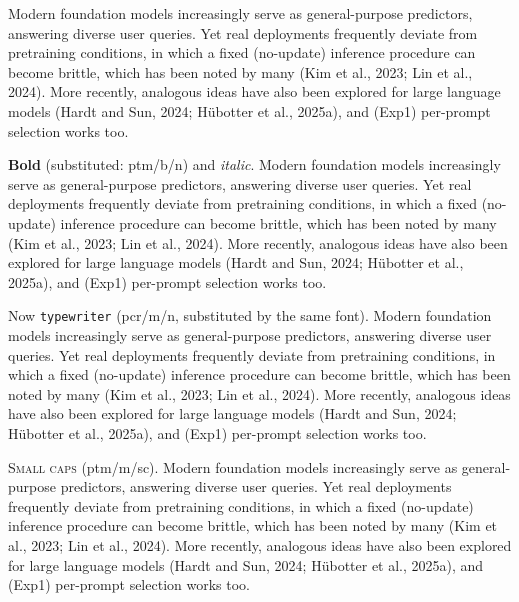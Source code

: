 \documentclass{article}
\begin{document}
\newcommand{\para}{Modern foundation models increasingly serve as general-purpose predictors, answering
diverse user queries. Yet real deployments frequently deviate from pretraining conditions, in which a
fixed (no-update) inference procedure can become brittle, which has been noted by many (Kim et al.,
2023; Lin et al., 2024). More recently, analogous ideas have also been explored for large language
models (Hardt and Sun, 2024; Hübotter et al., 2025a), and (Exp1) per-prompt selection works too.\par}
\para
\textbf{Bold} (substituted: ptm/b/n) and \textit{italic}.
\para
Now \texttt{typewriter} (pcr/m/n, substituted by the same font).
\para
\textsc{Small caps} (ptm/m/sc).
\para
\end{document}
